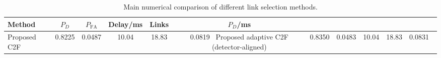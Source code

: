 \begin{table}[t]
    \centering
    \caption{Main numerical comparison of different link selection methods.}
    \label{tab:main_summary}
    \begin{tabular}{l c c c c c}
        \hline
        Method & $P_D$ & $P_{\mathrm{FA}}$ & Delay/ms & Links & $P_D$/ms \\
        \hline
        Proposed C2F & 0.8225 & 0.0487 & 10.04 & 18.83 & 0.0819 \
        Proposed adaptive C2F (detector-aligned) & 0.8350 & 0.0483 & 10.04 & 18.83 & 0.0831 \
        \hline
    \end{tabular}
\end{table}
